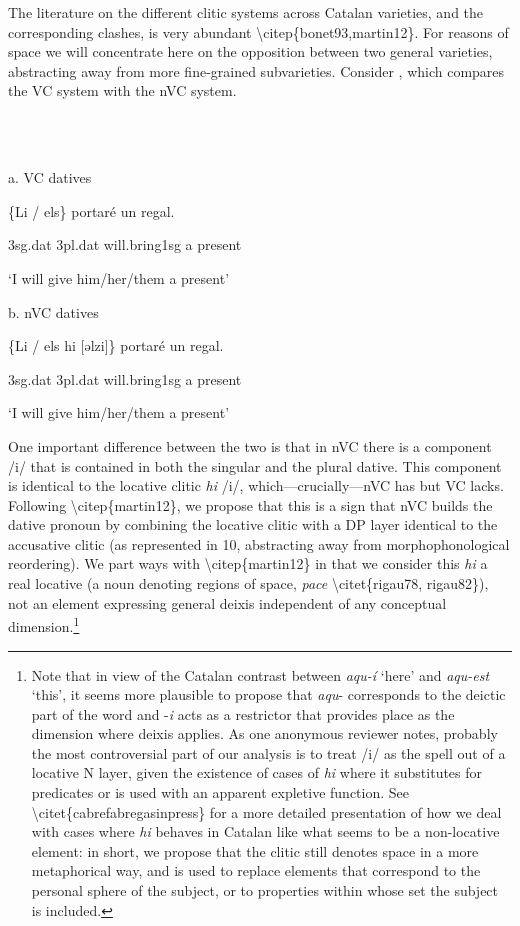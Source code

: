 \documentclass[output=paper,modfonts,nonflat]{langsci/langscibook}
\begin{document}
The literature on the different clitic systems across Catalan varieties, and the corresponding clashes, is very abundant {\textbackslash}citep\{bonet93,martin12\}. For reasons of space we will concentrate here on the opposition between two general varieties, abstracting away from more fine-grained subvarieties. Consider , which compares the VC system with the nVC system.

\ea%
    \label{ex:key:9}
    \gll\\
        \\
    \glt
    \z

          a.   VC datives

  \{Li  /  els\}     portaré     un regal.

    3sg.dat  3pl.dat  will.bring1sg  a  present

  ‘I will give him/her/them a present’

  b.   nVC datives

  \{Li  /  els hi [ǝlzi]\}   portaré     un regal.

    3sg.dat  3pl.dat  will.bring1sg  a  present

  ‘I will give him/her/them a present’

One important difference between the two is that in nVC there is a component /i/ that is contained in both the singular and the plural dative. This component is identical to the locative clitic \textit{hi} /i/, which—crucially—nVC has but VC lacks. Following {\textbackslash}citep\{martin12\}, we propose that this is a sign that nVC builds the dative pronoun by combining the locative clitic with a DP layer identical to the accusative clitic (as represented in 10, abstracting away from morphophonological reordering). We part ways with {\textbackslash}citep\{martin12\} in that we consider this \textit{hi} a real locative (a noun denoting regions of space, \textit{pace} {\textbackslash}citet\{rigau78, rigau82\}), not an element expressing general deixis independent of any conceptual dimension.\footnote{Note that in view of the Catalan contrast between \textit{aqu-í} ‘here’ and \textit{aqu-est} ‘this’, it seems more plausible to propose that \textit{aqu}{}- corresponds to the deictic part of the word and -\textit{i} acts as a restrictor that provides place as the dimension where deixis applies. As one anonymous reviewer notes, probably the most controversial part of our analysis is to treat /i/ as the spell out of a locative N layer, given the existence of cases of \textit{hi} where it substitutes for predicates or is used with an apparent expletive function. See {\textbackslash}citet\{cabrefabregasinpress\} for a more detailed presentation of how we deal with cases where \textit{hi} behaves in Catalan like what seems to be a non-locative element: in short, we propose that the clitic still denotes space in a more metaphorical way, and is used to replace elements that correspond to the personal sphere of the subject, or to properties within whose set the subject is included.} 
\end{document}
